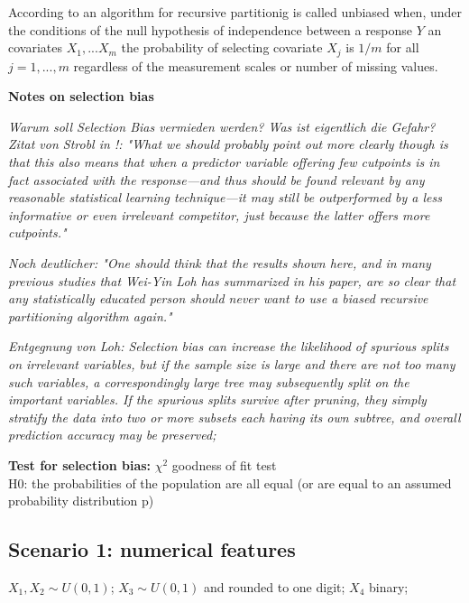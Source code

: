 



According to \citep{Hothorn.2006} an algorithm for recursive partitionig is called unbiased when, under the conditions of the null hypothesis of independence between a response $Y$ an covariates $X_{1},...X_{m}$ the probability of selecting covariate $X_{j}$ is $1/m$ for all $j = 1,...,m$ regardless of the measurement scales or number of missing values. 

\vspace{1cm}

\textbf{Notes on selection bias}

\textit{Warum soll Selection Bias vermieden werden? Was ist eigentlich die Gefahr? 
Zitat von Strobl in \citep{Loh.2014}!: "What we should probably point out more clearly though is that this also means that when
a predictor variable offering few cutpoints is in fact associated with the response—and thus
should be found relevant by any reasonable statistical learning technique—it may still be outperformed by a less informative or even irrelevant competitor, just because the latter offers more cutpoints."}

\textit{Noch deutlicher: "One should think that the results shown here, and in many previous studies that Wei-Yin Loh has summarized in his paper, are so clear that any statistically educated person should never
want to use a biased recursive partitioning algorithm again."}

\textit{Entgegnung von Loh: Selection bias can increase the likelihood of spurious splits on irrelevant variables,
but if the sample size is large and there are not too many such variables, a correspondingly
large tree may subsequently split on the important variables. If the spurious splits survive after
pruning, they simply stratify the data into two or more subsets each having its own subtree, and
overall prediction accuracy may be preserved;}






\vspace{1cm}



\textbf{Test for selection bias:} $\chi^2$ goodness of fit test\\
H0: the probabilities of the population are all equal (or are equal to an assumed probability distribution p)

\subsection{Scenario 1: numerical features}
$X_{1}, X_{2} \sim U(0,1)$; 
$X_{3} \sim U(0,1)$ and rounded to one digit;
$X_{4}$ binary;
